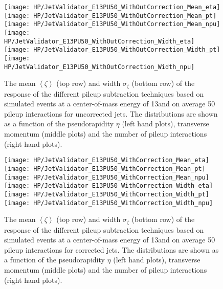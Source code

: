 \begin{figure}[h!h]
  \centering
  \texttt{[image: HP/JetValidator\_E13PU50\_WithOutCorrection\_Mean\_eta]}
  \texttt{[image: HP/JetValidator\_E13PU50\_WithOutCorrection\_Mean\_pt]}
  \texttt{[image: HP/JetValidator\_E13PU50\_WithOutCorrection\_Mean\_npu]}
  \\
  \texttt{[image: HP/JetValidator\_E13PU50\_WithOutCorrection\_Width\_eta]}
  \texttt{[image: HP/JetValidator\_E13PU50\_WithOutCorrection\_Width\_pt]}
  \texttt{[image: HP/JetValidator\_E13PU50\_WithOutCorrection\_Width\_npu]}
  \caption[Mean and width of the \pt{} response for different pileup subtraction techniques based on simulated \ttbar events with 13\TeV and PU=50 for uncorrected jets]{The mean $\left<\zeta\right>$ (top row) and width $\sigma_{\zeta}$ (bottom row) of the \pt{} response of the  different pileup subtraction techniques based on simulated \ttbar events at a center-of-mass energy of 13\TeV and on average 50 pileup interactions for uncorrected jets. The distributions are shown as a function of the pseudorapidity $\eta$ (left hand plots), transverse momentum (middle plots) and the number of pileup interactions (right hand plots).}
\end{figure}

\begin{figure}[h!h]
  \centering
  \texttt{[image: HP/JetValidator\_E13PU50\_WithCorrection\_Mean\_eta]}
  \texttt{[image: HP/JetValidator\_E13PU50\_WithCorrection\_Mean\_pt]}
  \texttt{[image: HP/JetValidator\_E13PU50\_WithCorrection\_Mean\_npu]}
  \\
  \texttt{[image: HP/JetValidator\_E13PU50\_WithCorrection\_Width\_eta]}
  \texttt{[image: HP/JetValidator\_E13PU50\_WithCorrection\_Width\_pt]}
  \texttt{[image: HP/JetValidator\_E13PU50\_WithCorrection\_Width\_npu]}
  \caption[Mean and width of the \pt{} response for different pileup subtraction techniques based on simulated \ttbar events with 13\TeV and PU=50 for corrected jets]{The mean $\left<\zeta\right>$ (top row) and width $\sigma_{\zeta}$ (bottom row) of the \pt{} response of the different pileup subtraction techniques based on simulated \ttbar events at a center-of-mass energy of 13\TeV and on average 50 pileup interactions for corrected jets. The distributions are shown as a function of the pseudorapidity $\eta$ (left hand plots), transverse momentum (middle plots) and the number of pileup interactions (right hand plots).}
\end{figure}
\clearpage

